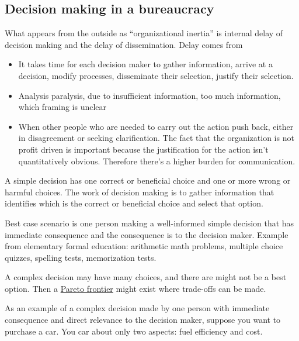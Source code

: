 \subsection{Decision making in a bureaucracy}

What appears from the outside as ``organizational inertia'' is internal delay of decision making and the delay of dissemination. 
Delay comes from
\begin{itemize}
    \item It takes time for each decision maker to gather information, arrive at a decision, modify processes, disseminate their selection, justify their selection. 
\item Analysis paralysis, due to {insufficient information, too much information, which framing is unclear}
\item When other people who are needed to carry out the action push back, either in disagreement or seeking clarification. The fact that the organization is not profit driven is important because the justification for the action isn't quantitatively obvious. Therefore there's a higher burden for communication.
\end{itemize}


A \gls{simple decision} has one correct or beneficial choice and one or more wrong or harmful choices. The work of decision making is to gather information that identifies which is the correct or beneficial choice and select that option.

Best case scenario is one person making a well-informed simple decision that has immediate consequence and the consequence is to the decision maker. Example from elementary formal education: arithmetic math problems, multiple choice quizzes, spelling tests, memorization tests. 

A complex decision may have many choices, and there are might not be a best option. Then a \href{https://en.wikipedia.org/wiki/Pareto_front}{Pareto frontier} might exist where trade-offs can be made. 

As an example of a complex decision made by one person with immediate consequence and direct relevance to the decision maker, suppose you want to purchase a car. You car about only two aspects: fuel efficiency and cost. 

